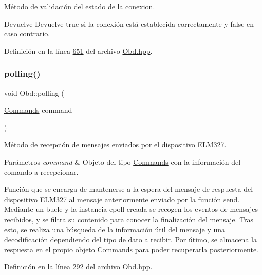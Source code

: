 Método de validación del estado de la conexion. 

\begin{DoxyReturn}{Devuelve}
Devuelve true si la conexión está establecida correctamente y false en caso contrario. 
\end{DoxyReturn}


Definición en la línea \hyperlink{Obd_8hpp_source_l00651}{651} del archivo \hyperlink{Obd_8hpp_source}{Obd.\+hpp}.

\mbox{\label{classObd_a0792ecb9247f32760269fdf64a178f8f}} 
\subsubsection{\texorpdfstring{polling()}{polling()}}
{\footnotesize\ttfamily void Obd\+::polling (\begin{DoxyParamCaption}\item[{\hyperlink{classCommands}{Commands}}]{command }\end{DoxyParamCaption})\hspace{0.3cm}{\ttfamily [inline]}}



Método de recepción de mensajes enviados por el dispositivo E\+L\+M327. 


\begin{DoxyParams}{Parámetros}
{\em command} & Objeto del tipo \hyperlink{classCommands}{Commands} con la información del comando a recepcionar.\\
\hline
\end{DoxyParams}
Función que se encarga de mantenerse a la espera del mensaje de respuesta del dispositivo E\+L\+M327 al mensaje anteriormente enviado por la función send. Mediante un bucle y la instancia epoll creada se recogen los eventos de mensajes recibidos, y se filtra su contenido para conocer la finalización del mensaje. Tras esto, se realiza una búsqueda de la información útil del mensaje y una decodificación dependiendo del tipo de dato a recibir. Por útimo, se almacena la respuesta en el propio objeto \hyperlink{classCommands}{Commands} para poder recuperarla posteriormente. 

Definición en la línea \hyperlink{Obd_8hpp_source_l00292}{292} del archivo \hyperlink{Obd_8hpp_source}{Obd.\+hpp}.

\mbox{\label{classObd_abf7e84f45236ea1c78c762ac895c532c}} 

